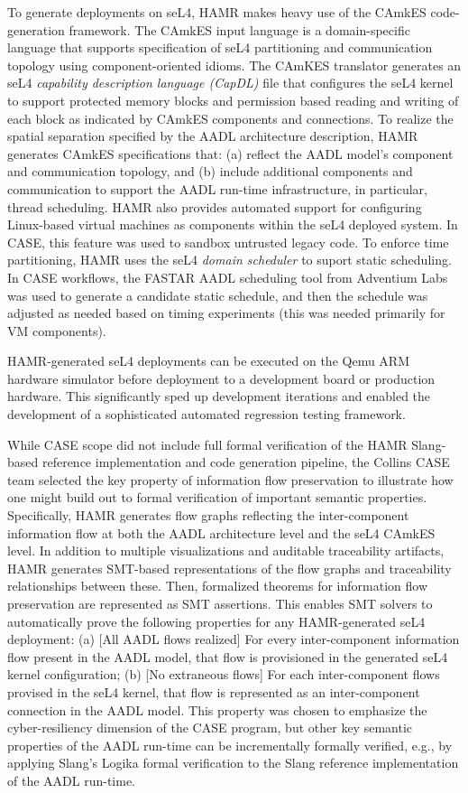 To generate deployments on seL4, HAMR makes heavy use of the
CAmkES code-generation framework.   The CAmkES input
language is a domain-specific language that supports specification
of seL4 partitioning and communication topology using
component-oriented idioms.  The CAmKES translator generates an
seL4 \emph{capability description language (CapDL)} file that
configures the seL4 kernel to support protected memory blocks
and permission based reading and writing of each block as
indicated by CAmkES components and connections.
To realize the spatial separation specified by the AADL
architecture description, HAMR generates CAmkES specifications
that: (a) reflect the AADL model's component and communication
topology, and (b) include additional components and communication
to support the AADL run-time infrastructure, in particular,
thread scheduling.
HAMR also provides automated support for configuring Linux-based
virtual machines as components within the seL4 deployed system. 
In CASE, this feature was used to sandbox untrusted legacy code.
To enforce time partitioning, HAMR uses the seL4 \emph{domain
scheduler} to suport static scheduling.  In CASE workflows,
the FASTAR AADL scheduling tool from Adventium Labs was used
to generate a candidate static schedule, and then the schedule
was adjusted as needed based on timing experiments (this was
needed primarily for VM components).

HAMR-generated seL4 deployments can be executed on the Qemu ARM
hardware simulator before deployment to a development board or
production hardware.  This significantly sped up development
iterations and enabled the development of a sophisticated
automated regression testing framework.

While CASE scope did not include full formal verification of
the HAMR Slang-based reference implementation and code generation
pipeline, the Collins CASE team selected the key property of
information flow preservation to illustrate how one might build
out to formal verification of important semantic properties.
Specifically, HAMR generates flow graphs reflecting the
inter-component information flow at both the AADL architecture
level and the seL4 CAmkES level.  In addition to multiple
visualizations and auditable traceability artifacts, HAMR
generates SMT-based representations of the flow graphs and
traceability relationships between these.  Then, formalized
theorems for information flow preservation are represented as
SMT assertions.  This enables SMT solvers to automatically prove
the following properties for any HAMR-generated seL4 deployment:
(a) [All AADL flows realized] For every inter-component information
flow present in the AADL model, that flow is provisioned in the
generated seL4 kernel configuration;  (b) [No extraneous flows] For
each inter-component flows provised in the seL4 kernel, that
flow is represented as an inter-component connection in the
AADL model.   This property was chosen to emphasize the
cyber-resiliency dimension of the CASE program, but other
key semantic properties of the AADL run-time can be incrementally
formally verified, e.g., by applying Slang's Logika formal
verification to the Slang reference implementation of the
AADL run-time.  

